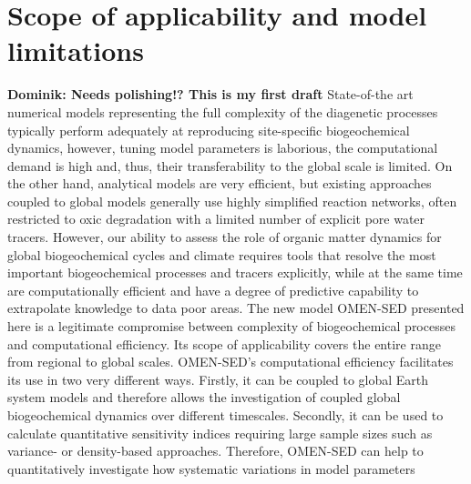 \documentclass[gmd, manuscript]{copernicus}
\begin{document}
% 


\section{Scope of applicability and model limitations}\label{sec:Appl_Limitations}
\textbf{Dominik: Needs polishing!? This is my first draft}
State-of-the art numerical models representing the full complexity of the diagenetic processes typically perform adequately at reproducing site-specific biogeochemical dynamics, however, tuning model parameters is laborious, 
the computational demand is high and, thus, their transferability to the global scale is limited. On the other hand, analytical models are very efficient, but existing approaches coupled to global models generally use highly 
simplified reaction networks, often restricted to oxic degradation with a limited number of explicit pore water tracers. However, our ability to assess the role of organic matter dynamics for global biogeochemical cycles and climate 
requires tools that resolve the most important biogeochemical processes and tracers explicitly, while at the same time are computationally efficient and have a degree of predictive capability to extrapolate knowledge to data poor areas. 
The new model OMEN-SED presented here is a legitimate compromise between complexity of biogeochemical processes and computational efficiency. 
Its scope of applicability covers the entire range from regional to global scales. 
OMEN-SED's computational efficiency facilitates its use in two very different ways. Firstly, it can be coupled to global Earth system models and therefore allows the investigation of coupled global biogeochemical dynamics over different timescales. 
Secondly, it can be used to calculate quantitative sensitivity indices requiring large sample sizes such as variance- or density-based approaches. Therefore, OMEN-SED can help to quantitatively investigate how systematic variations in model parameters 
\end{document}
